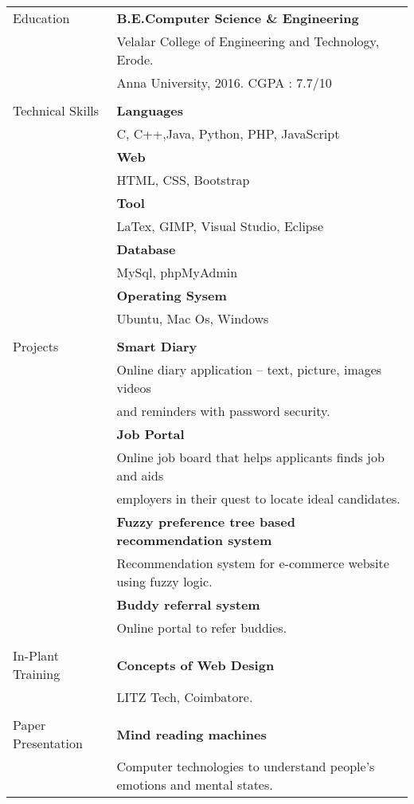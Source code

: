 \documentclass[letterpaper,11pt,oneside]{article}
\begin{document}
\noindent \begin{tabular}{@{} l l}
\Large{Education}    & \textbf{B.E.Computer Science \& Engineering} \\
     & Velalar College of Engineering and Technology, Erode. \\ 
     & Anna University, 2016.  CGPA : 7.7/10 \\
     & \\
\Large{Technical Skills}    & \textbf{Languages} \\
     & C, C++,Java, Python, PHP, JavaScript \\
     & \textbf{Web} \\
     & HTML, CSS, Bootstrap \\
     & \textbf{Tool}\\
     & LaTex, GIMP, Visual Studio, Eclipse \\
     & \textbf{Database} \\
     & MySql, phpMyAdmin \\
     & \textbf{Operating Sysem} \\
     & Ubuntu, Mac Os, Windows\\
     & \\
  \Large{Projects}   & \textbf{Smart Diary} \\
     & Online diary application – text, picture, images videos \\
     & and reminders with password security. \\
     & \textbf{Job Portal} \\
     & Online job board that helps applicants finds job and aids \\
     & employers in their quest to locate ideal candidates. \\
     & \textbf{Fuzzy preference tree based recommendation system} \\
     & Recommendation system for e-commerce website using fuzzy logic. \\
     & \textbf{Buddy referral system} \\
     & Online portal to refer buddies.\\
     & \\
\Large{In-Plant Training}  & \textbf{Concepts of Web Design}\\
     & LITZ Tech, Coimbatore.\\
     &\\
\Large{Paper Presentation} & \textbf{Mind reading machines}\\
     &Computer technologies to understand people's emotions and mental states.\\

\end{tabular}
\end{document}
